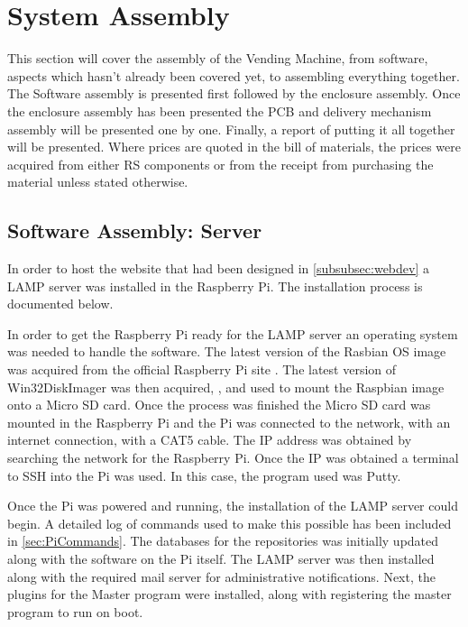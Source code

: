 \documentclass[a4paper,11pt]{article}
\numberwithin{figure}{section}
\numberwithin{table}{section}
\begin{document}
\newpage

\section{System Assembly}\thispagestyle{sectionstart}
This section will cover the assembly of the Vending Machine, from software, aspects which hasn't already been covered yet, to assembling everything together. The Software assembly is presented first followed by the enclosure assembly. Once the enclosure assembly has been presented the PCB and delivery mechanism assembly will be presented one by one. Finally, a report of putting it all together will be presented. Where prices are quoted in the bill of materials, the prices were acquired from either RS components \cite{rsonline} or from the receipt from purchasing the material unless stated otherwise.

\subsection{Software Assembly: Server}

In order to host the website that had been designed in \autoref{subsubsec:webdev} a LAMP server was installed in the Raspberry Pi. The installation process is documented below.

In order to get the Raspberry Pi ready for the LAMP server an operating system was needed to handle the software. The latest version of the Rasbian OS image was acquired from the official Raspberry Pi site \cite{raspbian}. The latest version of Win32DiskImager was then acquired, \cite{diskimage}, and used to mount the Raspbian image onto a Micro SD card. Once the process was finished the Micro SD card was mounted in the Raspberry Pi and the Pi was connected to the network, with an internet connection, with a CAT5 cable. The IP address was obtained by searching the network for the Raspberry Pi. Once the IP was obtained a terminal to SSH into the Pi was used. In this case, the program used was Putty.

Once the Pi was powered and running, the installation of the LAMP server could begin. A detailed log of commands used to make this possible has been included in \autoref{sec:PiCommands}. The databases for the repositories was initially updated along with the software on the Pi itself. The LAMP server was then installed along with the required mail server for administrative notifications. Next, the plugins for the Master program were installed, along with registering the master program to run on boot.
\end{document}
